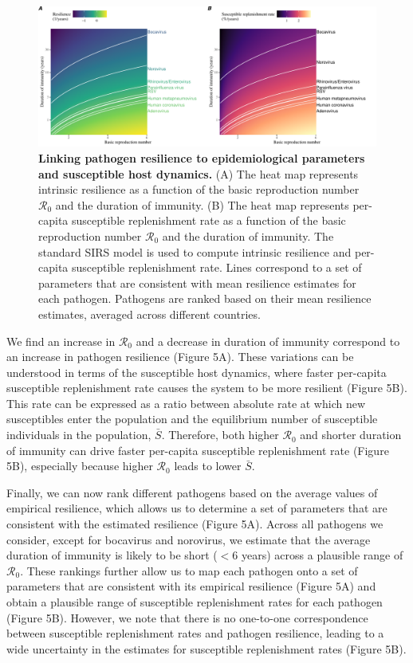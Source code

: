 \documentclass[12pt]{article}
\begin{document}
\begin{figure}[!th]
\begin{center}
\includegraphics[width=\textwidth]{../figure_summary/figure_summary.pdf}
\caption{
\textbf{Linking pathogen resilience to epidemiological parameters and susceptible host dynamics.}
(A) The heat map represents intrinsic resilience as a function of the basic reproduction number $\mathcal R_0$ and the duration of immunity.
(B) The heat map represents per-capita susceptible replenishment rate as a function of the basic reproduction number $\mathcal R_0$ and the duration of immunity.
The standard SIRS model is used to compute intrinsic resilience and per-capita susceptible replenishment rate.
Lines correspond to a set of parameters that are consistent with mean resilience estimates for each pathogen.
Pathogens are ranked based on their mean resilience estimates, averaged across different countries.
}
\end{center}
\end{figure}

We find an increase in $\mathcal R_0$ and a decrease in duration of immunity correspond to an increase in pathogen resilience (Figure 5A).
These variations can be understood in terms of the susceptible host dynamics, where faster per-capita susceptible replenishment rate causes the system to be more resilient (Figure 5B).
This rate can be expressed as a ratio between absolute rate at which new susceptibles enter the population and the equilibrium number of susceptible individuals in the population, $\bar{S}$.
Therefore, both higher $\mathcal R_0$ and shorter duration of immunity can drive faster per-capita susceptible replenishment rate (Figure 5B), especially because higher $\mathcal R_0$ leads to lower $\bar{S}$.

Finally, we can now rank different pathogens based on the average values of empirical resilience, which allows us to determine a set of parameters that are consistent with the estimated resilience (Figure 5A).
Across all pathogens we consider, except for bocavirus and norovirus, we estimate that the average duration of immunity is likely to be short ($<6$ years) across a plausible range of $\mathcal R_0$.
These rankings further allow us to map each pathogen onto a set of parameters that are consistent with its empirical resilience (Figure 5A) and obtain a plausible range of susceptible replenishment rates for each pathogen (Figure 5B).
However, we note that there is no one-to-one correspondence between susceptible replenishment rates and pathogen resilience, leading to a wide uncertainty in the estimates for susceptible replenishment rates (Figure 5B).
\end{document}
